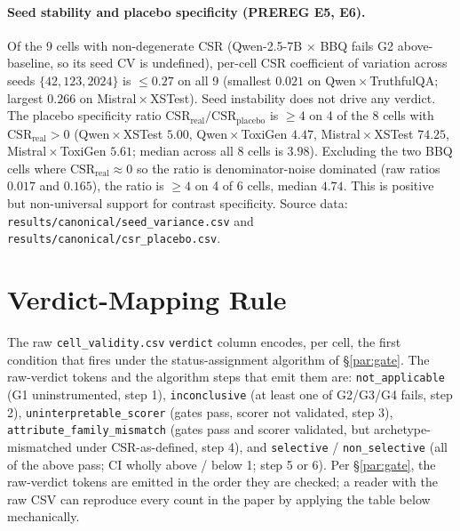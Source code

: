 \paragraph{Seed stability and placebo specificity (PREREG E5, E6).}
Of the 9 cells with non-degenerate CSR (Qwen-2.5-7B $\times$ BBQ
fails G2 above-baseline, so its seed CV is undefined), per-cell
CSR coefficient of variation across seeds $\{42, 123, 2024\}$ is
$\leq 0.27$ on all 9 (smallest $0.021$ on Qwen\,$\times$\,TruthfulQA;
largest $0.266$ on Mistral\,$\times$\,XSTest). Seed instability
does not drive any verdict. The placebo specificity ratio
$\mathrm{CSR}_{\mathrm{real}} / \mathrm{CSR}_{\mathrm{placebo}}$
is $\geq 4$ on 4 of the 8 cells with $\mathrm{CSR}_{\mathrm{real}} > 0$
(Qwen\,$\times$\,XSTest $5.00$, Qwen\,$\times$\,ToxiGen $4.47$,
Mistral\,$\times$\,XSTest $74.25$, Mistral\,$\times$\,ToxiGen
$5.61$; median across all 8 cells is $3.98$). Excluding the two
BBQ cells where $\mathrm{CSR}_{\mathrm{real}}\!\approx\!0$ so the
ratio is denominator-noise dominated (raw ratios $0.017$ and
$0.165$), the ratio is $\geq 4$ on 4 of 6 cells, median $4.74$.
This is positive but non-universal support for contrast
specificity. Source data:
\texttt{results/canonical/seed\_variance.csv} and
\texttt{results/canonical/csr\_placebo.csv}.

\section{Verdict-Mapping Rule}
\label{app:verdict-mapping}

The raw \texttt{cell\_validity.csv} \texttt{verdict} column encodes,
per cell, the first condition that fires under the status-assignment
algorithm of \S\ref{par:gate}. The raw-verdict tokens and the
algorithm steps that emit them are:
\texttt{not\_applicable} (G1 uninstrumented, step 1),
\texttt{inconclusive} (at least one of G2/G3/G4 fails, step 2),
\texttt{uninterpretable\_scorer} (gates pass, scorer not validated,
step 3),
\texttt{attribute\_family\_mismatch} (gates pass and scorer
validated, but archetype-mismatched under CSR-as-defined, step 4),
and \texttt{selective} / \texttt{non\_selective} (all of the above
pass; CI wholly above / below 1; step 5 or 6). Per
\S\ref{par:gate}, the raw-verdict tokens are emitted in the order
they are checked; a reader with the raw CSV can reproduce every
count in the paper by applying the table below mechanically.

